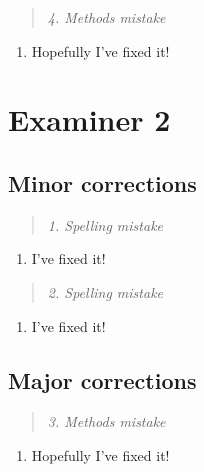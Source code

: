\documentclass[
]{article}
\providecommand{\tightlist}{%
  \setlength{\itemsep}{0pt}\setlength{\parskip}{0pt}}
\begin{document}
\begin{quote}
\emph{4. Methods mistake}
\end{quote}

\begin{enumerate}
\def\labelenumi{\arabic{enumi}.}
\setcounter{enumi}{3}
\tightlist
\item
  Hopefully I've fixed it!
\end{enumerate}

\newpage

\hypertarget{examiner-2}{%
\section*{Examiner 2}\label{examiner-2}}

\hypertarget{minor-corrections-1}{%
\subsection*{Minor corrections}\label{minor-corrections-1}}

\begin{quote}
\emph{1. Spelling mistake}
\end{quote}

\begin{enumerate}
\def\labelenumi{\arabic{enumi}.}
\tightlist
\item
  I've fixed it!
\end{enumerate}

\begin{quote}
\emph{2. Spelling mistake}
\end{quote}

\begin{enumerate}
\def\labelenumi{\arabic{enumi}.}
\setcounter{enumi}{1}
\tightlist
\item
  I've fixed it!
\end{enumerate}

\hypertarget{major-corrections-1}{%
\subsection*{Major corrections}\label{major-corrections-1}}

\begin{quote}
\emph{3. Methods mistake}
\end{quote}

\begin{enumerate}
\def\labelenumi{\arabic{enumi}.}
\setcounter{enumi}{2}
\tightlist
\item
  Hopefully I've fixed it!
\end{enumerate}
\end{document}
